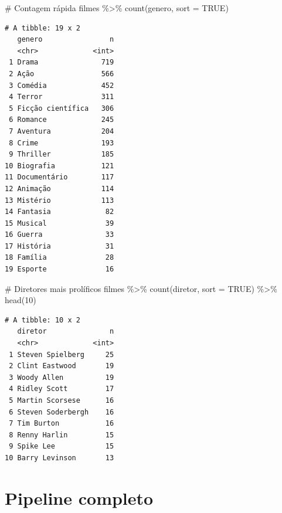 \documentclass[
  letterpaper,
]{scrbook}
\newenvironment{Shaded}{\begin{snugshade}}{\end{snugshade}}
\newcommand{\AttributeTok}[1]{\textcolor[rgb]{0.40,0.45,0.13}{#1}}
\newcommand{\CommentTok}[1]{\textcolor[rgb]{0.37,0.37,0.37}{#1}}
\newcommand{\ConstantTok}[1]{\textcolor[rgb]{0.56,0.35,0.01}{#1}}
\newcommand{\DecValTok}[1]{\textcolor[rgb]{0.68,0.00,0.00}{#1}}
\newcommand{\FunctionTok}[1]{\textcolor[rgb]{0.28,0.35,0.67}{#1}}
\newcommand{\NormalTok}[1]{\textcolor[rgb]{0.00,0.23,0.31}{#1}}
\newcommand{\SpecialCharTok}[1]{\textcolor[rgb]{0.37,0.37,0.37}{#1}}
\begin{document}
\begin{Shaded}
\begin{Highlighting}[]
\CommentTok{\# Contagem rápida}
\NormalTok{filmes }\SpecialCharTok{\%\textgreater{}\%} \FunctionTok{count}\NormalTok{(genero, }\AttributeTok{sort =} \ConstantTok{TRUE}\NormalTok{)}
\end{Highlighting}
\end{Shaded}

\begin{verbatim}
# A tibble: 19 x 2
   genero                n
   <chr>             <int>
 1 Drama               719
 2 Ação                566
 3 Comédia             452
 4 Terror              311
 5 Ficção científica   306
 6 Romance             245
 7 Aventura            204
 8 Crime               193
 9 Thriller            185
10 Biografia           121
11 Documentário        117
12 Animação            114
13 Mistério            113
14 Fantasia             82
15 Musical              39
16 Guerra               33
17 História             31
18 Família              28
19 Esporte              16
\end{verbatim}

\begin{Shaded}
\begin{Highlighting}[]
\CommentTok{\# Diretores mais prolíficos}
\NormalTok{filmes }\SpecialCharTok{\%\textgreater{}\%} \FunctionTok{count}\NormalTok{(diretor, }\AttributeTok{sort =} \ConstantTok{TRUE}\NormalTok{) }\SpecialCharTok{\%\textgreater{}\%} \FunctionTok{head}\NormalTok{(}\DecValTok{10}\NormalTok{)}
\end{Highlighting}
\end{Shaded}

\begin{verbatim}
# A tibble: 10 x 2
   diretor               n
   <chr>             <int>
 1 Steven Spielberg     25
 2 Clint Eastwood       19
 3 Woody Allen          19
 4 Ridley Scott         17
 5 Martin Scorsese      16
 6 Steven Soderbergh    16
 7 Tim Burton           16
 8 Renny Harlin         15
 9 Spike Lee            15
10 Barry Levinson       13
\end{verbatim}

\section*{Pipeline completo}\label{pipeline-completo}

\end{document}
